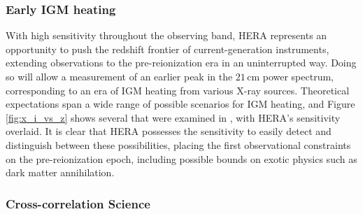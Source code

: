 \documentclass[preprint]{aastex}
\begin{document}

\subsubsection{Early IGM heating}

With high sensitivity throughout the observing band, HERA represents an opportunity to push the redshift frontier of current-generation instruments, extending observations to the pre-reionization era in an uninterrupted way.  Doing so will allow a measurement of an earlier peak in the $21\,\textrm{cm}$ power spectrum, corresponding to an era of IGM heating from various X-ray sources.  Theoretical expectations span a wide range of possible scenarios for IGM heating, and Figure \ref{fig:x_i_vs_z} shows several that were examined in \cite{mesinger_et_al2013}, with HERA's sensitivity overlaid.  It is clear that HERA possesses the sensitivity to easily detect and distinguish between these possibilities, placing the first observational constraints on the pre-reionization epoch, including possible bounds on exotic physics such as dark matter annihilation.



\subsubsection{Cross-correlation Science}
\end{document}
